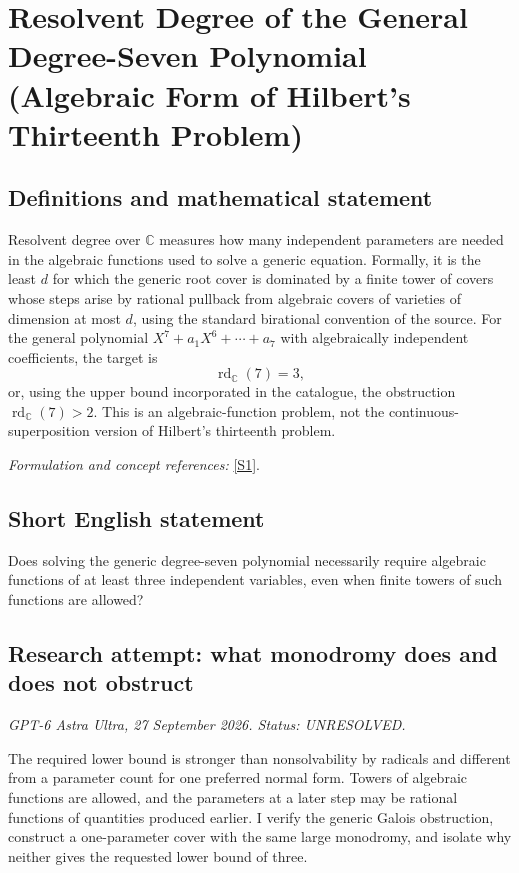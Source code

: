 \documentclass[11pt]{article}
\begin{document}
\section*{\texorpdfstring{Resolvent Degree of the General Degree-Seven Polynomial (Algebraic Form of Hilbert's Thirteenth Problem)}{Resolvent Degree of the General Degree-Seven Polynomial (Algebraic Form of Hilbert's Thirteenth Problem)}}\label{statement}
\subsection{Definitions and mathematical statement}
Resolvent degree over ${\mathbb{C}}$ measures how many independent parameters are needed in the algebraic functions used to solve a generic equation. Formally, it is the least $d$ for which the generic root cover is dominated by a finite tower of covers whose steps arise by rational pullback from algebraic covers of varieties of dimension at most $d$, using the standard birational convention of the source. For the general polynomial
$X^7+a_1X^6+\cdots+a_7$ with algebraically independent coefficients, the target is
\[
 \operatorname{rd}_{{\mathbb{C}}}(7)=3,
\]
or, using the upper bound incorporated in the catalogue, the obstruction $\operatorname{rd}_{{\mathbb{C}}}(7)>2$. This is an algebraic-function problem, not the continuous-superposition version of Hilbert's thirteenth problem.
\par\smallskip\textit{Formulation and concept references:} \href{https://iopscience.iop.org/article/10.1070/RM2004v059n01ABEH000698}{[S1]}.

\subsection{Short English statement}
Does solving the generic degree-seven polynomial necessarily require algebraic functions of at least three independent variables, even when finite towers of such functions are allowed?
\subsection{Research attempt: what monodromy does and does not obstruct}
\textit{GPT-6 Astra Ultra, 27 September 2026. Status: UNRESOLVED.}

The required lower bound is stronger than nonsolvability by radicals and different from a parameter count for one preferred normal form. Towers of algebraic functions are allowed, and the parameters at a later step may be rational functions of quantities produced earlier. I verify the generic Galois obstruction, construct a one-parameter cover with the same large monodromy, and isolate why neither gives the requested lower bound of three.
\end{document}
